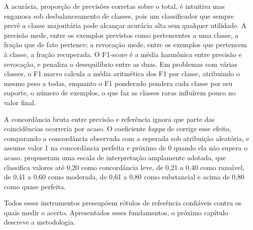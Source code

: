 A acurácia, proporção de previsões corretas sobre o total, é intuitiva mas enganosa sob desbalanceamento de classes, pois um classificador que sempre prevê a classe majoritária pode alcançar acurácia alta sem qualquer utilidade. A precisão mede, entre os exemplos previstos como pertencentes a uma classe, a fração que de fato pertence; a revocação mede, entre os exemplos que pertencem à classe, a fração recuperada. O F1-score é a média harmônica entre precisão e revocação, e penaliza o desequilíbrio entre as duas. Em problemas com várias classes, o F1 macro calcula a média aritmética dos F1 por classe, atribuindo o mesmo peso a todas, enquanto o F1 ponderado pondera cada classe por seu suporte, o número de exemplos, o que faz as classes raras influírem pouco no valor final.

A concordância bruta entre previsão e referência ignora que parte das coincidências ocorreria por acaso. O coeficiente \textit{kappa} de \citet{cohen1960} corrige esse efeito, comparando a concordância observada com a esperada sob atribuição aleatória, e assume valor 1 na concordância perfeita e próximo de 0 quando ela não supera o acaso. \citet{landis_koch1977} propuseram uma escala de interpretação amplamente adotada, que classifica valores até 0,20 como concordância leve, de 0,21 a 0,40 como razoável, de 0,41 a 0,60 como moderada, de 0,61 a 0,80 como substancial e acima de 0,80 como quase perfeita.

Todos esses instrumentos pressupõem rótulos de referência confiáveis contra os quais medir o acerto. Apresentados esses fundamentos, o próximo capítulo descreve a metodologia.
